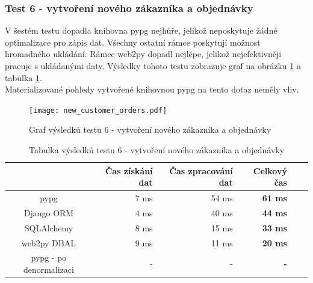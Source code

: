 \documentclass[ing,male,java,dept456]{diploma}						%
\begin{document}
\subsubsection{Test 6 - vytvoření nového zákazníka a objednávky}
V šestém testu dopadla knihovna pypg nejhůře, jelikož neposkytuje žádné optimalizace pro zápis dat. Všechny ostatní rámce poskytují možnost hromadného ukládání. Rámec web2py dopadl nejlépe, jelikož nejefektivněji pracuje s ukládanými daty. Výsledky tohoto testu zobrazuje graf na obrázku \ref{fig:TestNCO} a tabulka \ref{tab:TestNCO}.\\
Materializované pohledy vytvořené knihovnou pypg na tento dotaz neměly vliv. \\

\begin{figure}[h!]
    \centering
    \texttt{[image: new\_customer\_orders.pdf]}
    \caption{Graf výsledků testu 6 - vytvoření nového zákazníka a objednávky}
    \label{fig:TestNCO}
\end{figure}
\begin{table}[h!]
  \centering
  \begin{tabular}{|c|r|r|r|r|r|}
    \hline
    & Čas získání dat & Čas zpracování dat & \textbf{Celkový čas} \\
    \hline
    pypg & 7 ms & 54 ms & \textbf{61 ms} \\
    \hline
    Django ORM & 4 ms & 40 ms & \textbf{44 ms} \\
    \hline
    SQLAlchemy & 8 ms & 15 ms & \textbf{33 ms} \\
    \hline
    web2py DBAL & 9 ms & 11 ms & \textbf{20 ms} \\
    \hline
    pypg - po denormalizaci & - & - & \textbf{-} \\
    \hline
  \end{tabular}
  \caption{Tabulka výsledků testu 6 - vytvoření nového zákazníka a objednávky}
  \label{tab:TestNCO}
\end{table}
\end{document}
